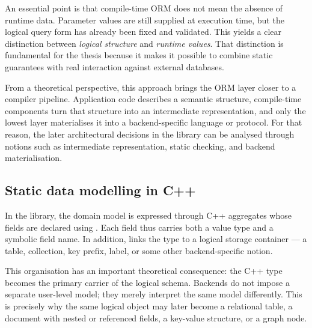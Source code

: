 An essential point is that compile-time ORM does not mean the absence of runtime data. Parameter values are still supplied at execution time, but the logical query form has already been fixed and validated. This yields a clear distinction between \emph{logical structure} and \emph{runtime values}. That distinction is fundamental for the thesis because it makes it possible to combine static guarantees with real interaction against external databases.

From a theoretical perspective, this approach brings the ORM layer closer to a compiler pipeline. Application code describes a semantic structure, compile-time components turn that structure into an intermediate representation, and only the lowest layer materialises it into a backend-specific language or protocol. For that reason, the later architectural decisions in the library can be analysed through notions such as intermediate representation, static checking, and backend materialisation.

\subsection{Static data modelling in C++}

In the library, the domain model is expressed through C++ aggregates whose fields are declared using . Each field thus carries both a value type and a symbolic field name. In addition,  links the type to a logical storage container --- a table, collection, key prefix, label, or some other backend-specific notion.

This organisation has an important theoretical consequence: the C++ type becomes the primary carrier of the logical schema. Backends do not impose a separate user-level model; they merely interpret the same model differently. This is precisely why the same logical object may later become a relational table, a document with nested or referenced fields, a key-value structure, or a graph node.

